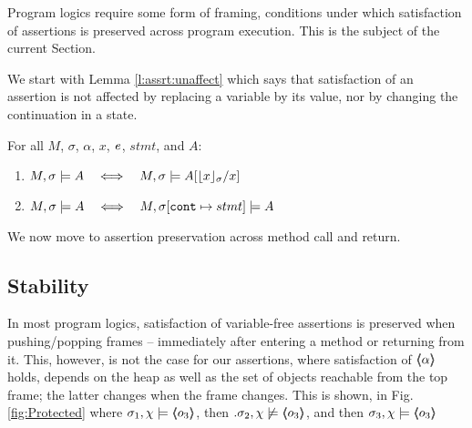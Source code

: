 Program logics require some form of framing, \ie conditions under which  satisfaction of  assertions is preserved across program execution. 
This is the subject of the current Section.

We start with  Lemma \ref{l:assrt:unaffect}  which says that satisfaction of an assertion is not affected by replacing a variable by its value, nor by changing the continuation in a state.


\begin{lemma}
\label{lemma:addr:expr}
\label{l:assrt:unaffect}
For all $M$, $\sigma$, $\alpha$, $x$, $\mathit{e}$, $stmt$, and $A$:

\begin{enumerate}
\item
\label{one:ad:exp}
\label{l:assrt:unaffect:one}
$\satisfiesA{M}{\sigma}{A}   \ \ \ \Longleftrightarrow\ \ \ \satisfiesA{M}{\sigma}{A[{\interpret \sigma x}/x]}   $ 
\item
$ \satisfiesA{M}{\sigma}{A}   \ \ \ \Longleftrightarrow\ \ \ \satisfiesA{M}{\sigma[\prg{cont}\mapsto stmt]}{A}$ 
\end{enumerate}

\end{lemma}

 \noindent
We now move to assertion preservation across method call and return. %

\subsection{Stability} %
\label{s:preserve:call:ret}
In most program logics, satisfaction of  variable-free assertions  is preserved when pushing/popping frames
-- \ie immediately after entering a method or  returning from it.
This, however, is not   the case for our assertions, where satisfaction of   $\langle\!\!\langle \alpha \rangle\!\!\rangle$ holds, depends on the heap as well as the set of objects reachable from the top frame;
the latter  changes when the frame changes.
This is shown, \eg in  Fig. \ref{fig:Protected} where 
$\sigma_1,\chi \models \langle\!\!\langle o_3 \rangle\!\!\rangle$, then $.\sigma_2,\chi \not\models \langle\!\!\langle o_3 \rangle\!\!\rangle$, and then $\sigma_3,\chi  \models \langle\!\!\langle o_3 \rangle\!\!\rangle$

